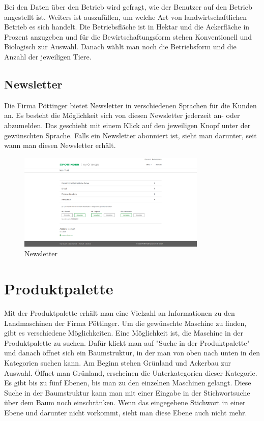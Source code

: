 Bei den Daten über den Betrieb wird gefragt, wie der Benutzer auf den Betrieb angestellt ist. Weiters ist auszufüllen, um welche Art von landwirtschaftlichen Betrieb es sich handelt. Die Betriebsfläche ist in Hektar und die Ackerfläche in Prozent anzugeben und für die Bewirtschaftungsform stehen Konventionell und Biologisch zur Auswahl. Danach wählt man noch die Betriebsform und die Anzahl der jeweiligen Tiere.

\subsection{Newsletter}

Die Firma Pöttinger bietet Newsletter in verschiedenen Sprachen für die Kunden an. Es besteht die Möglichkeit sich von diesen Newsletter jederzeit an- oder abzumelden. Das geschieht mit einem Klick auf den jeweiligen Knopf unter der gewünschten Sprache. Falls ein Newsletter abonniert ist, sieht man darunter, seit wann man diesen Newsletter erhält.

\begin{figure}[H]
	\centerline{
		\includegraphics[width=0.8\textwidth]{./grafiken/erm_profil_newsletter.png}
	}
	\vskip0pt
	\caption{Newsletter} \label{fig:newsletter}
\end{figure}

\section{Produktpalette}

Mit der Produktpalette erhält man eine Vielzahl an Informationen zu den Landmaschinen der Firma Pöttinger. Um die gewünschte Maschine zu finden, gibt es verschiedene Möglichkeiten. Eine Möglichkeit ist, die Maschine in der Produktpalette zu suchen. Dafür klickt man auf "Suche in der Produktpalette" und danach öffnet sich ein Baumstruktur, in der man von oben nach unten in den Kategorien suchen kann. Am Beginn stehen Grünland und Ackerbau zur Auswahl. Öffnet man Grünland, erscheinen die Unterkategorien dieser Kategorie. Es gibt bis zu fünf Ebenen, bis man zu den einzelnen Maschinen gelangt. Diese Suche in der Baumstruktur kann man mit einer Eingabe in der Stichwortsuche über dem Baum noch einschränken. Wenn das eingegebene Stichwort in einer Ebene und darunter nicht vorkommt, sieht man diese Ebene auch nicht mehr.

